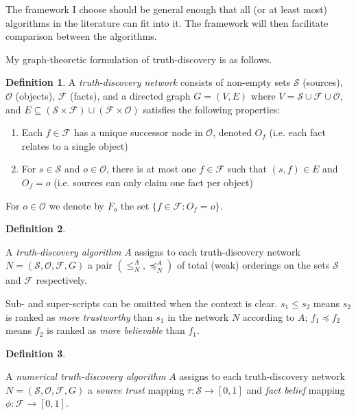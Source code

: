 \documentclass{article}
\theoremstyle{definition}
\newtheorem{definition}{Definition}
\theoremstyle{plain}
\theoremstyle{remark}
\begin{document}
The framework I choose should be general enough that all (or at least most)
algorithms in the literature can fit into it. The framework will then
facilitate comparison between the algorithms.

My graph-theoretic formulation of truth-discovery is as follows.

\begin{definition}

A \emph{truth-discovery network} consists of non-empty sets $\mathcal{S}$
(sources), $\mathcal{O}$ (objects), $\mathcal{F}$ (facts), and a directed graph
$G=(V, E)$ where $V = \mathcal{S} \cup \mathcal{F} \cup \mathcal{O}$, and $E
\subseteq (\mathcal{S} \times \mathcal{F}) \cup (\mathcal{F} \times
\mathcal{O})$ satisfies the following properties:

\begin{enumerate}

\item Each $f \in \mathcal{F}$ has a unique successor node in $\mathcal{O}$,
denoted $O_f$ (i.e. each fact relates to a single object)

\item For $s \in \mathcal{S}$ and $o \in \mathcal{O}$, there is at most one $f
\in \mathcal{F}$ such that $(s, f) \in E$ and $O_f = o$ (i.e. sources can only
claim one fact per object)

\end{enumerate}

For $o \in \mathcal{O}$ we denote by $F_o$ the set $\{f \in \mathcal{F} : O_f =
o \}$.

\end{definition}

\begin{definition}
\label{def:truth_discovery_algorithm}

A \emph{truth-discovery algorithm} $A$ assigns to each truth-discovery network
$N=(\mathcal{S}, \mathcal{O}, \mathcal{F}, G)$ a pair $(\le_N^A, \preceq_N^A)$
of total (weak) orderings on the sets $\mathcal{S}$ and $\mathcal{F}$
respectively.

Sub- and super-scripts can be omitted when the context is clear. $s_1 \le s_2$
means $s_2$ is ranked as \emph{more trustworthy} than $s_1$ in the network $N$
according to $A$; $f_1 \preceq f_2$ means $f_2$ is ranked as \emph{more
believable} than $f_1$.

\end{definition}

\begin{definition}
\label{def:numerical}

A \emph{numerical truth-discovery algorithm} $A$ assigns to each
truth-discovery network $N=(\mathcal{S}, \mathcal{O}, \mathcal{F}, G)$ a
\emph{source trust} mapping $\tau: \mathcal{S} \rightarrow [0, 1]$ and
\emph{fact belief} mapping $\phi: \mathcal{F} \rightarrow [0, 1]$.

\end{definition}
\end{document}
